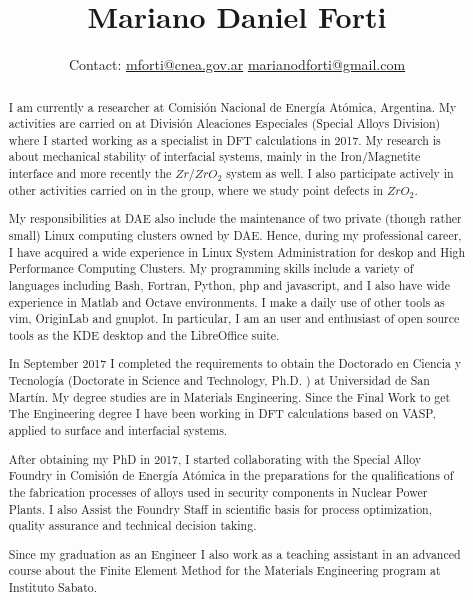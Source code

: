 \documentclass{my_cv}
\begin{document}
\title{Mariano Daniel Forti}
\date{ \centering \small{ Contact: \hspace{3cm} \url{mforti@cnea.gov.ar} \hspace{3cm} \url{marianodforti@gmail.com } }}
\begin{titlepage}
\maketitle

\begin{abstract}
  \linespread{1.5}\selectfont
  \thispagestyle{empty}
    I am currently a researcher at Comisión Nacional de Energía Atómica, Argentina. My activities are carried on at División Aleaciones Especiales (Special Alloys Division) where I started working as a specialist in DFT calculations in 2017. My research is about mechanical stability of interfacial systems, mainly in the Iron/Magnetite interface and more recently the $Zr / ZrO_{2}$ system as well. I also participate actively in other activities carried on in the group, where we study point defects in $ZrO_2$.
 
  My responsibilities at DAE also include the maintenance of two private (though rather small) Linux computing clusters owned by DAE. Hence, during my professional career, I have acquired a wide experience in Linux System Administration for deskop and High Performance Computing Clusters. My programming skills include a variety of languages including Bash, Fortran, Python, php and javascript, and I also have wide experience in Matlab and Octave environments. I make a daily use of other tools as vim, OriginLab and gnuplot. In particular, I am an user and enthusiast of open source tools as the KDE desktop and the LibreOffice suite. 

In September 2017 I completed the requirements to obtain the Doctorado en Ciencia y Tecnología (Doctorate in Science and Technology, Ph.D. ) at Universidad de San Martín. My degree studies are in Materials Engineering. Since the Final Work to get The Engineering degree I have been working in DFT calculations based on VASP, applied to surface and interfacial systems.

After obtaining my PhD in 2017, I started collaborating with the Special Alloy Foundry in Comisión de Energía Atómica in the preparations for the qualifications of the fabrication processes of alloys used in security components in Nuclear Power Plants. I also Assist the Foundry Staff in scientific basis for process optimization, quality assurance and technical decision taking. 

  Since my graduation as an Engineer I also work as a teaching assistant in an advanced course about the Finite Element Method for the Materials Engineering program at Instituto Sabato.

\end{abstract}
\vfill
\end{titlepage}
\end{document}
